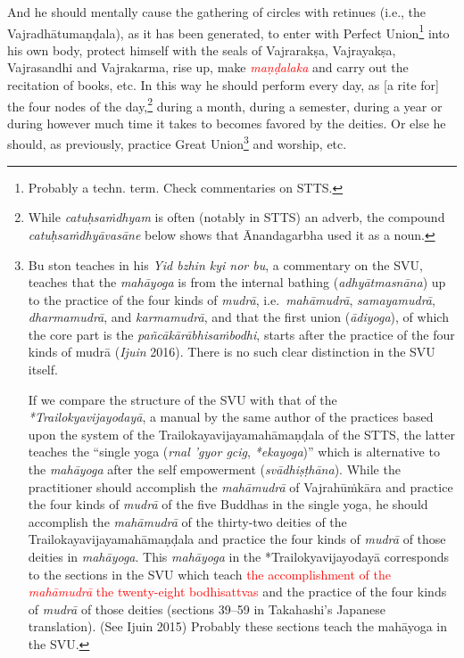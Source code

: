 \documentclass[11pt]{book}
\newcommand{\red}[1]{\textcolor{red}{#1}}
\begin{document}
And he should mentally cause the gathering of circles with retinues (i.e., the Vajradhātumaṇḍala), as it has been generated, to enter with Perfect Union\footnote{Probably a techn. term. Check commentaries on STTS.} into his own body, protect himself with the seals of Vajrarakṣa, Vajrayakṣa, Vajrasandhi and Vajrakarma, rise up, make \red{\emph{maṇḍalaka}} and carry out the recitation of books, etc. 
In this way he should perform every day, as [a rite for] the four nodes of the day,\footnote{While \emph{catuḥsaṁdhyam} is often (notably in STTS) an adverb, the compound \emph{catuḥsaṁdhyāvasāne} below shows that Ānandagarbha used it as a noun.} during a month, during a semester, during a year or during however much time it takes to becomes favored by the deities. Or else he should, as previously, practice Great Union\footnote{Bu ston teaches in his \textit{Yid bzhin kyi nor bu}, a commentary on the SVU, teaches that the \textit{mahāyoga} is from the internal bathing (\textit{adhyātmasnāna}) up to the practice of the four kinds of \textit{mudrā}, i.e.\ \textit{mahāmudrā}, \textit{samayamudrā}, \textit{dharmamudrā}, and \textit{karmamudrā}, and that the first union (\textit{ādiyoga}), of which the core part is the \textit{pañcākārābhisaṁbodhi}, starts after  the practice of the four kinds of mudrā (\textit{Ijuin} 2016). There is no such clear distinction in the SVU itself.\par
	If we compare the structure of the SVU with that of the \textit{*Trailokyavijayodayā}, a manual by the same author of the practices based upon the system of the Trailokayavijayamahāmaṇḍala of the STTS, the latter teaches the “single yoga (\textit{rnal 'gyor gcig}, \textit{*ekayoga})” which is alternative to the \textit{mahāyoga} after the self empowerment (\textit{svādhiṣṭhāna}). While the practitioner should accomplish the \textit{mahāmudrā} of Vajrahūṁkāra and practice the four kinds of \textit{mudrā} of the five Buddhas in the single yoga, he should accomplish the \textit{mahāmudrā} of the thirty-two deities of the Trailokayavijayamahāmaṇḍala and practice the four kinds of \textit{mudrā} of  those deities in  \textit{mahāyoga}. This \textit{mahāyoga} in the *Trailokyavijayodayā corresponds to the sections in the SVU which teach \red{the accomplishment of the \textit{mahāmudrā} the twenty-eight bodhisattvas} and the practice of the four kinds of \textit{mudrā} of those deities (sections 39–59 in Takahashi's Japanese translation).  (See Ijuin 2015) Probably these sections teach the mahāyoga in the SVU.} and worship, etc.
\end{document}
